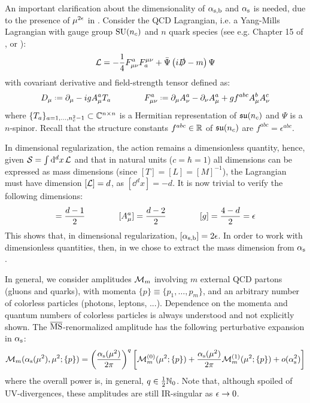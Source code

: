 
An important clarification about the dimensionality of $ \alpha_\text{s,b} $ and $ \alpha_\text{s} $ is needed, due to the presence of $ \mu^{2\epsilon} $ in . Consider the QCD Lagrangian, i.e. a Yang-Mills Lagrangian with gauge group $ \mathrm{SU}(n_c) $ and $ n $ quark species (see e.g. Chapter 15 of \cite{Weinberg-1996}, or ):
\begin{equation}
  \mathcal{L} = - \frac{1}{4} F_{\mu \nu}^a F^{\mu \nu}_a + \bar{\Psi} \left( i \slashed{D} - m \right) \Psi
\end{equation}
with covariant derivative and field-strength tensor defined as:
\begin{equation}
  D_\mu \defeq \pa_\mu - i g A_\mu^a T_a
  \qquad \qquad
  F_{\mu \nu}^a \defeq \pa_\mu A_\nu^a - \pa_\nu A_\mu^a + g f^{abc} A_\mu^b A_\nu^c
  \label{eq:cov-der-field-str}
\end{equation}
where $ \{T_a\}_{a = 1, \dots, n_c^2 - 1} \subset \mathbb{C}^{n \times n} $ is a Hermitian representation of $ \mathfrak{su}(n_c) $ and $ \Psi $ is a $ n $-spinor. Recall that the structure constants $ f^{abc} \in \mathbb{R} $ of $ \mathfrak{su}(n_c) $ are $ f^{abc} = \epsilon^{abc} $.

In dimensional regularization, the action remains a dimensionless quantity, hence, given $ \mathcal{S} = \int \mathrm{d}^dx \, \mathcal{L} $ and that in natural units ($ c = \hbar = 1 $) all dimensions can be expressed as mass dimensions (since $ [T] = [L] = [M]^{-1} $), the Lagrangian must have dimension $ [\mathcal{L}] = d $, as $ [\dd^dx] = -d $. It is now trivial to verify the following dimensions:
\begin{equation*}
  [\Psi] = \frac{d - 1}{2}
  \qquad \qquad
  [A_\mu^a] = \frac{d - 2}{2}
  \qquad \qquad
  [g] = \frac{4 - d}{2} = \de
\end{equation*}
This shows that, in dimensional regularization, $ [\alpha_\text{s,b}] = 2\epsilon $. In order to work with dimensionless quantities, then, in  we chose to extract the mass dimension from $ \alpha_\text{s} $.

In general, we consider amplitudes $ \mathcal{M}_m $ involving $ m $ external QCD partons (gluons and quarks), with momenta $ \{p\} \equiv \{p_1, \dots, p_m\} $, and an arbitrary number of colorless particles (photons, leptons, ...). Dependence on the momenta and quantum numbers of colorless particles is always understood and not explicitly shown. The $ \overline{\text{MS}} $-renormalized amplitude has the following perturbative expansion in $ \alpha_\text{s} $:
\begin{equation}
  \mathcal{M}_m(\alpha_\text{s}(\mu^2), \mu^2 ; \{p\}) = \left( \frac{\alpha_\text{s}(\mu^2)}{2\pi} \right)^q \left[ \mathcal{M}_m^{(0)}(\mu^2 ; \{p\}) + \frac{\alpha_\text{s}(\mu^2)}{2\pi} \mathcal{M}_m^{(1)}(\mu^2 ; \{p\}) + o(\alpha_\text{s}^2) \right]
  \label{eq:mat-exp}
\end{equation}
where the overall power is, in general, $ q \in \frac{1}{2} \mathbb{N}_0 $. Note that, although spoiled of UV-divergences, these amplitudes are still IR-singular as $ \epsilon \rightarrow 0 $.

